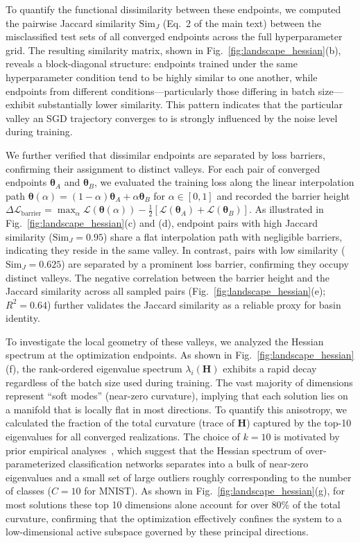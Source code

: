 \documentclass[aps,prx,preprint,superscriptaddress,nofootinbib]{revtex4-2}
\begin{document}
To quantify the functional dissimilarity between these endpoints, we computed the pairwise Jaccard similarity $\mathrm{Sim}_J$ (Eq.~2 of the main text) between the misclassified test sets of all converged endpoints across the full hyperparameter grid. The resulting similarity matrix, shown in Fig.~\ref{fig:landscape_hessian}(b), reveals a block-diagonal structure: endpoints trained under the same hyperparameter condition tend to be highly similar to one another, while endpoints from different conditions---particularly those differing in batch size---exhibit substantially lower similarity. This pattern indicates that the particular valley an SGD trajectory converges to is strongly influenced by the noise level during training.

We further verified that dissimilar endpoints are separated by loss barriers, confirming their assignment to distinct valleys. For each pair of converged endpoints $\bm{\theta}_A$ and $\bm{\theta}_B$, we evaluated the training loss along the linear interpolation path $\bm{\theta}(\alpha) = (1-\alpha)\bm{\theta}_A + \alpha\bm{\theta}_B$ for $\alpha \in [0,1]$ and recorded the barrier height $\Delta\mathcal{L}_\mathrm{barrier} = \max_\alpha \mathcal{L}(\bm{\theta}(\alpha)) - \tfrac{1}{2}[\mathcal{L}(\bm{\theta}_A) + \mathcal{L}(\bm{\theta}_B)]$. As illustrated in Fig.~\ref{fig:landscape_hessian}(c) and (d), endpoint pairs with high Jaccard similarity ($\mathrm{Sim}_J = 0.95$) share a flat interpolation path with negligible barriers, indicating they reside in the same valley. In contrast, pairs with low similarity ($\mathrm{Sim}_J = 0.625$) are separated by a prominent loss barrier, confirming they occupy distinct valleys. The negative correlation between the barrier height and the Jaccard similarity across all sampled pairs (Fig.~\ref{fig:landscape_hessian}(e); $R^2 = 0.64$) further validates the Jaccard similarity as a reliable proxy for basin identity.

To investigate the local geometry of these valleys, we analyzed the Hessian spectrum at the optimization endpoints. As shown in Fig.~\ref{fig:landscape_hessian}(f), the rank-ordered eigenvalue spectrum $\lambda_i(\mathbf{H})$ exhibits a rapid decay regardless of the batch size used during training. The vast majority of dimensions represent ``soft modes'' (near-zero curvature), implying that each solution lies on a manifold that is locally flat in most directions. To quantify this anisotropy, we calculated the fraction of the total curvature (trace of $\mathbf{H}$) captured by the top-10 eigenvalues for all converged realizations. The choice of $k=10$ is motivated by prior empirical analyses~\cite{sagunEmpiricalAnalysisHessian2018a}, which suggest that the Hessian spectrum of over-parameterized classification networks separates into a bulk of near-zero eigenvalues and a small set of large outliers roughly corresponding to the number of classes ($C=10$ for MNIST). As shown in Fig.~\ref{fig:landscape_hessian}(g), for most solutions these top 10 dimensions alone account for over 80\% of the total curvature, confirming that the optimization effectively confines the system to a low-dimensional active subspace governed by these principal directions.
\end{document}
